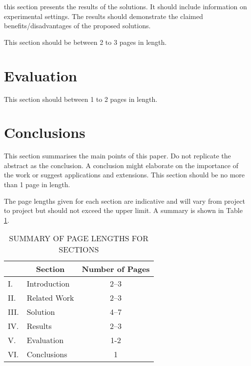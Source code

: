 \documentclass[12pt,a4paper]{article}
\begin{document}
this section presents the results of the solutions.  It should include information on experimental settings.  The results should demonstrate the claimed benefits/disadvantages of the proposed solutions.

This section should be between 2 to 3 pages in length.

\section{Evaluation}

This section should between 1 to 2 pages in length.

\section{Conclusions}

This section summarises the main points of this paper.  Do not replicate the abstract as the conclusion.  A conclusion might elaborate on the importance of the work or suggest applications and extensions.  This section should be no more than 1 page in length.

The page lengths given for each section are indicative and will vary from project to project but should not exceed the upper limit.  A summary is shown in Table \ref{summary}.

\begin{table}[htb]
\centering
\caption{SUMMARY OF PAGE LENGTHS FOR SECTIONS}
\vspace*{6pt}
\label{summary}
\begin{tabular}{|ll|c|} \hline
& \multicolumn{1}{c|}{\bf Section} & {\bf Number of Pages} \\ \hline
I. & Introduction & 2--3 \\ \hline
II. & Related Work & 2--3 \\ \hline
III. & Solution & 4--7 \\ \hline
IV. & Results & 2--3 \\ \hline
V. & Evaluation & 1-2 \\ \hline
VI. & Conclusions & 1 \\ \hline
\end{tabular}
\end{table}



\end{document}
